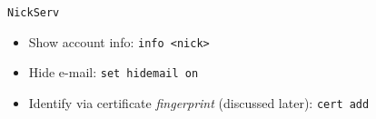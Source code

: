 \documentclass{beamer}
\begin{document}
\begin{frame}{\texttt{NickServ}}
\begin{itemize}
	\item Show account info: \texttt{info <nick>}
	\item Hide e-mail: \texttt{set hidemail on}
	\item Identify via certificate \emph{fingerprint} (discussed later): \texttt{cert add}
\end{itemize}
\end{frame}
\end{document}

